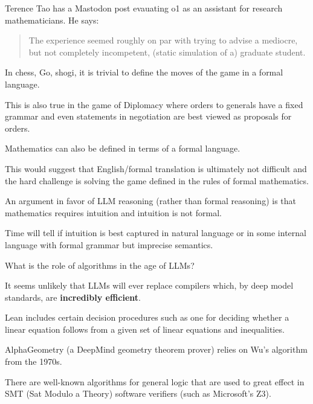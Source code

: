 {

Terence Tao has a Mastodon post evauating o1 as an assistant for research mathematicians. He says:

\vfill
\begin{quotation}
The experience seemed roughly on par with trying to advise a mediocre, but not completely incompetent, (static simulation of a) graduate student.
\end{quotation}


In chess, Go, shogi, it is trivial to define the moves of the game in a formal language.

\vfill
This is also true in the game of Diplomacy where orders to generals have a fixed grammar and even statements
in negotiation are best viewed as proposals for orders.

\vfill
Mathematics can also be defined in terms of a formal language.

\vfill
This would suggest that English/formal translation is ultimately not difficult and the
hard challenge is solving the game defined in the rules of formal mathematics.


An argument in favor of LLM reasoning (rather than formal reasoning) is that mathematics requires intuition and intuition is not formal.

\vfill
Time will tell if intuition is best captured in natural language or in some internal language with formal grammar but imprecise semantics.


What is the role of algorithms in the age of LLMs?

\vfill
It seems unlikely that LLMs will ever replace compilers which, by deep model standards, are {\bf incredibly efficient}.

\vfill
Lean includes certain decision procedures such as one for deciding whether a linear equation
follows from a given set of linear equations and inequalities.

\vfill
AlphaGeometry (a DeepMind geometry theorem prover) relies on Wu's algorithm from the 1970s.


There are well-known algorithms for general logic that are used to great effect in SMT (Sat Modulo a Theory) software verifiers
(such as Microsoft's Z3).

}

